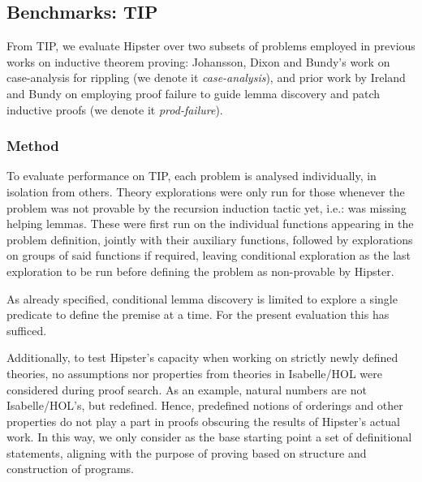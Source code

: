 

\subsection{Benchmarks: TIP}

From TIP, we evaluate Hipster over two subsets of problems employed in previous works on inductive theorem proving: Johansson, Dixon and Bundy's work on case-analysis for rippling \cite{IsaPcase} (we denote it \emph{case-analysis}), and prior work by Ireland and Bundy on employing proof failure to guide lemma discovery and patch inductive proofs \cite{productiveuse} (we denote it \emph{prod-failure}).

\subsubsection{Method}

To evaluate performance on TIP, each problem is analysed individually, in isolation from others.
%
Theory explorations were only run for those whenever the problem was not provable by the recursion induction tactic yet, i.e.: was missing helping lemmas.
%
These were first run on the individual functions appearing in the problem definition, jointly with their auxiliary functions, followed by explorations on groups of said functions if required, leaving conditional exploration as the last exploration to be run before defining the problem as non-provable by Hipster.

As already specified, conditional lemma discovery is limited to explore a single predicate to define the premise at a time. For the present evaluation this has sufficed.

Additionally, to test Hipster's capacity when working on strictly newly defined theories, no assumptions nor properties from theories in Isabelle/HOL were considered during proof search.
%
As an example, natural numbers are not Isabelle/HOL's, but redefined.
%
Hence, predefined notions of orderings and other properties do not play a part in proofs obscuring the results of Hipster's actual work.
%
In this way, we only consider as the base starting point a set of definitional statements, aligning with the purpose of proving based on structure and construction of programs.

